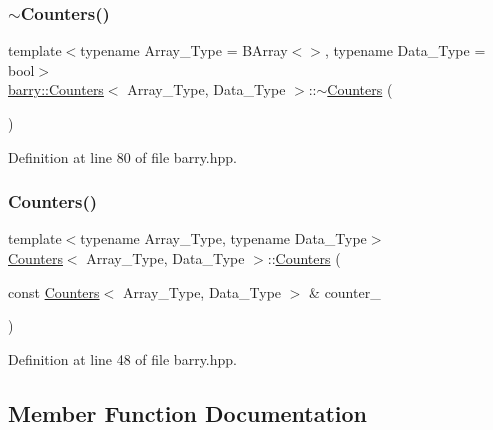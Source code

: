 \subsubsection{\texorpdfstring{$\sim$\+Counters()}{~Counters()}}
{\footnotesize\ttfamily template$<$typename Array\+\_\+\+Type = B\+Array$<$$>$, typename Data\+\_\+\+Type = bool$>$ \\
\hyperlink{classbarry_1_1_counters}{barry\+::\+Counters}$<$ Array\+\_\+\+Type, Data\+\_\+\+Type $>$\+::$\sim$\hyperlink{classbarry_1_1_counters}{Counters} (\begin{DoxyParamCaption}{ }\end{DoxyParamCaption})\hspace{0.3cm}{\ttfamily [inline]}}



Definition at line 80 of file barry.\+hpp.

\mbox{\label{classbarry_1_1_counters_a178c0267c1f52a36e10e9d257a21a224}} 
\subsubsection{\texorpdfstring{Counters()}{Counters()}\hspace{0.1cm}{\footnotesize\ttfamily [2/2]}}
{\footnotesize\ttfamily template$<$typename Array\+\_\+\+Type, typename Data\+\_\+\+Type$>$ \\
\hyperlink{classbarry_1_1_counters}{Counters}$<$ Array\+\_\+\+Type, Data\+\_\+\+Type $>$\+::\hyperlink{classbarry_1_1_counters}{Counters} (\begin{DoxyParamCaption}\item[{const \hyperlink{classbarry_1_1_counters}{Counters}$<$ Array\+\_\+\+Type, Data\+\_\+\+Type $>$ \&}]{counter\+\_\+ }\end{DoxyParamCaption})\hspace{0.3cm}{\ttfamily [inline]}}



Definition at line 48 of file barry.\+hpp.



\subsection{Member Function Documentation}
\mbox{\label{classbarry_1_1_counters_a5b5dafc7a3e0eedae400457f69937613}} 
